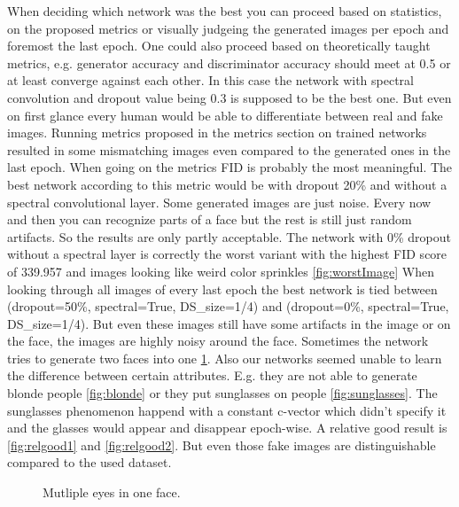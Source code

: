 \documentclass[12pt, a4paper]{article}
\begin{document}
When deciding which network was the best you can proceed based on statistics, on the proposed metrics or visually judgeing the generated images per epoch and foremost the last epoch. 
One could also proceed based on theoretically taught metrics, e.g. generator accuracy and discriminator accuracy should meet at 0.5 or at least converge against each other. In this case the network with spectral convolution and dropout value being 0.3 is supposed to be the best one. But even on first glance every human would be able to differentiate between real and fake images. 
Running metrics proposed in the metrics section on trained networks resulted in some mismatching images even compared to the generated ones in the last epoch. When going on the metrics FID is probably the most meaningful. The best network according to this metric would be with dropout 20\% and without a spectral convolutional layer. Some generated images are just noise. Every now and then you can recognize parts of a face but the rest is still just random artifacts. So the results are only partly acceptable. The network with 0\% dropout without a spectral layer is correctly the worst variant with the highest FID score of 339.957 and images looking like weird color sprinkles \ref{fig:worstImage}
When looking through all images of every last epoch the best network is tied between (dropout=50\%, spectral=True, DS\_size=1/4) and (dropout=0\%, spectral=True, DS\_size=1/4). But even these images still have some artifacts in the image or on the face, the images are highly noisy around the face. 
Sometimes the network tries to generate two faces into one \ref{fig:twoFacesInOne}. 
Also our networks seemed unable to learn the difference between certain attributes. 
E.g. they are not able to generate blonde people \ref{fig:blonde} or they put sunglasses on people \ref{fig:sunglasses}. The sunglasses phenomenon happend with a constant c-vector which didn't specify it and the glasses would appear and disappear epoch-wise.
A relative good result is \ref{fig:relgood1} and \ref{fig:relgood2}. But even those fake images are distinguishable compared to the used dataset.
\begin{figure}
    \caption{Mutliple eyes in one face.}
    \label{fig:twoFacesInOne}
\end{figure}
\end{document}
